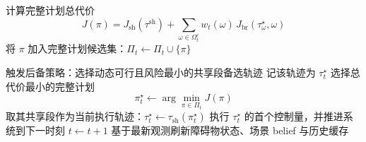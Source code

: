 \begin{algorithm}[t]
\begin{algorithmic}[1]
            \State 计算完整计划总代价
            \[
                J(\pi)=J_{\mathrm{sh}}(\tau^{\mathrm{sh}})
                + \sum_{\omega\in\Omega_t^{c}} w_t(\omega)\, J_{\mathrm{br}}(\tau_{\omega}^{\star},\omega)
            \]
            \State 将 $\pi$ 加入完整计划候选集：$\Pi_t \gets \Pi_t \cup \{\pi\}$
        \EndIf
    \EndFor

        \State 触发后备策略：选择动态可行且风险最小的共享段备选轨迹
        \State 记该轨迹为 $\tau_t^{\star}$
    \Else
        \State 选择总代价最小的完整计划
        \[
            \pi_t^{\star} \gets \arg\min_{\pi \in \Pi_t} J(\pi)
        \]
        \State 取其共享段作为当前执行轨迹：$\tau_t^{\star} \gets \tau_{\mathrm{sh}}(\pi_t^{\star})$
    \EndIf
    \State 执行 $\tau_t^{\star}$ 的首个控制量，并推进系统到下一时刻 $t\leftarrow t+1$
    \State 基于最新观测刷新障碍物状态、场景 belief 与历史缓存
\EndWhile
\end{algorithmic}
\end{algorithm}

